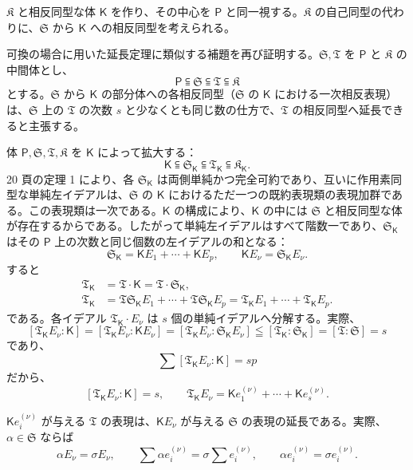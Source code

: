 $\mathfrak K$ と相反同型な体 $\mathsf{K}$ を作り、その中心を $\mathsf P$ と同一視する。$\mathfrak K$ の自己同型の代わりに、$\mathfrak S$ から $\mathsf{K}$ への相反同型を考えられる。

可換の場合に用いた延長定理に類似する補題を再び証明する。$\mathfrak S,\mathfrak T$ を $\mathsf P$ と $\mathfrak K$ の中間体とし、
\[
\mathsf P \subseteqq \mathfrak S \subseteqq \mathfrak T \subseteqq \mathfrak K
\]
とする。$\mathfrak S$ から $\mathsf{K}$ の部分体への各相反同型（$\mathfrak S$ の $\mathsf{K}$ における一次相反表現）は、$\mathfrak S$ 上の $\mathfrak T$ の次数 $s$ と少なくとも同じ数の仕方で、$\mathfrak T$ の相反同型へ延長できると主張する。

体 $\mathsf P,\mathfrak S,\mathfrak T,\mathfrak K$ を $\mathsf{K}$ によって拡大する：
\[
\mathsf{K}\subseteqq \mathfrak S_{\mathsf{K}}\subseteqq \mathfrak T_{\mathsf{K}}\subseteqq \mathfrak K_{\mathsf{K}}.
\]
20 頁の定理 1 により、各 $\mathfrak S_{\mathsf{K}}$ は両側単純かつ完全可約であり、互いに作用素同型な単純左イデアルは、$\mathfrak S$ の $\mathsf{K}$ におけるただ一つの既約表現類の表現加群である。この表現類は一次である。$\mathsf{K}$ の構成により、$\mathsf{K}$ の中には $\mathfrak S$ と相反同型な体が存在するからである。したがって単純左イデアルはすべて階数一であり、$\mathfrak S_{\mathsf{K}}$ はその $\mathsf P$ 上の次数と同じ個数の左イデアルの和となる：
\[
\mathfrak S_{\mathsf{K}}=\mathsf K E_1+\cdots+\mathsf K E_p,\qquad \mathsf K E_\nu=\mathfrak S_{\mathsf{K}} E_\nu.
\]
すると
\[
\begin{aligned}
\mathfrak T_{\mathsf{K}}&=\mathfrak T\cdot \mathsf{K}=\mathfrak T\cdot \mathfrak S_{\mathsf{K}},\\
\mathfrak T_{\mathsf{K}}&=\mathfrak T\mathfrak S_{\mathsf{K}} E_1+\cdots+\mathfrak T\mathfrak S_{\mathsf{K}} E_p
              =\mathfrak T_{\mathsf{K}} E_1+\cdots+\mathfrak T_{\mathsf{K}} E_p.
\end{aligned}
\]
である。各イデアル $\mathfrak T_{\mathsf{K}}\cdot E_\nu$ は $s$ 個の単純イデアルへ分解する。実際、
\[
[\mathfrak T_{\mathsf{K}} E_\nu:\mathsf{K}]=[\mathfrak T_{\mathsf{K}} E_\nu:\mathsf K E_\nu]=[\mathfrak T_{\mathsf{K}} E_\nu:\mathfrak S_{\mathsf{K}} E_\nu]\leqq[\mathfrak T_{\mathsf{K}}:\mathfrak S_{\mathsf{K}}]=[\mathfrak T:\mathfrak S]=s
\]
であり、
\[
\sum [\mathfrak T_{\mathsf{K}} E_\nu:\mathsf{K}]=sp
\]
だから、
\[
[\mathfrak T_{\mathsf{K}} E_\nu:\mathsf{K}]=s,
\qquad
\mathfrak T_{\mathsf{K}} E_\nu=\mathsf K e_1^{(\nu)}+\cdots+\mathsf K e_s^{(\nu)}.
\]

$\mathsf K e_i^{(\nu)}$ が与える $\mathfrak T$ の表現は、$\mathsf K E_\nu$ が与える $\mathfrak S$ の表現の延長である。実際、$\alpha\in\mathfrak S$ ならば
\[
\alpha E_\nu=\sigma E_\nu,\qquad
\sum \alpha e_i^{(\nu)}=\sigma\sum e_i^{(\nu)},\qquad
\alpha e_i^{(\nu)}=\sigma e_i^{(\nu)}.
\]

